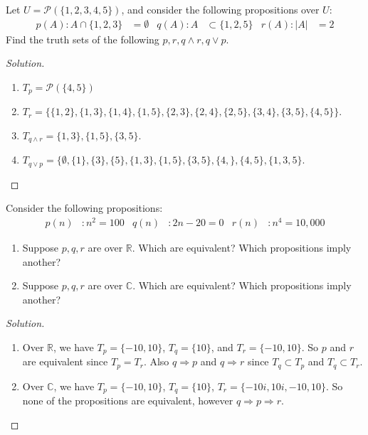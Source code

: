     \begin{problem}
    Let $U = \mathcal{P}(\{1,2,3,4,5\})$, and consider the following propositions over $U$:
    \begin{align*}
        p(A):A\cap\{1,2,3\} &=\emptyset & q(A):A&\subset\{1,2,5\} & r(A):|A| &=2
    \end{align*}
    Find the truth sets of the following $p,r, q\land r, q\lor p$.
    \end{problem}
    \begin{proof}[Solution]
    \vspace{-\topsep}
    \
    \begin{enumerate}
        \item $T_{p} = \mathcal{P}(\{4,5\})$
        \item $T_{r} = \{\{1,2\},\{1,3\},\{1,4\},\{1,5\},\{2,3\},\{2,4\},\{2,5\},\{3,4\},\{3,5\},\{4,5\}\}$.
        \item $T_{q\land r} = \{1,3\},\{1,5\},\{3,5\}$.
        \item $T_{q\lor p} = \{\emptyset, \{1\},\{3\},\{5\},\{1,3\},\{1,5\},\{3,5\},\{4,\},\{4,5\},\{1,3,5\}$.
    \end{enumerate}
    \end{proof}
    \begin{problem}
    Consider the following propositions:
    \begin{align*}
        p(n)&:n^{2}=100 & q(n)&:2n-20=0 & r(n)&:n^{4}=10,000
    \end{align*}
    \begin{enumerate}
        \item Suppose $p,q,r$ are over $\mathbb{R}$. Which are equivalent? Which propositions imply another?
        \item Suppose $p,q,r$ are over $\mathbb{C}$. Which are equivalent? Which propositions imply another?
    \end{enumerate}
    \end{problem}
    \begin{proof}[Solution]
    \vspace{-\topsep}
    \
    \begin{enumerate}
        \item Over $\mathbb{R}$, we have $T_{p} = \{-10,10\}$, $T_{q} = \{10\}$, and $T_{r} = \{-10,10\}$. So $p$ and $r$ are equivalent since $T_{p} = T_{r}$. Also $q\Rightarrow p$ and $q\Rightarrow r$ since $T_{q} \subset T_{p}$ and $T_{q}\subset T_{r}$.
        \item Over $\mathbb{C}$, we have $T_{p} = \{-10,10\}$, $T_{q} = \{10\}$, $T_{r} = \{-10i,10i,-10,10\}$. So none of the propositions are equivalent, however $q\Rightarrow p \Rightarrow r$.
    \end{enumerate}
    \end{proof}
